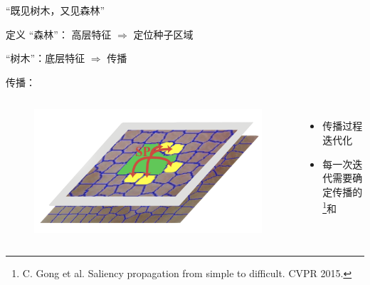 \begin{frame}{``既见树木，又见森林''}
\begin{block}{定义}
``森林''： 高层特征 $\Rightarrow$ 定位种子区域

``树木''：底层特征 $\Rightarrow$ 传播
\end{block}
\vfill
传播：
\begin{columns}[c]
\begin{figure}
    \centering
    \includegraphics[width=.9\linewidth]{figures/propagationillustrator.png}
\end{figure}

\begin{itemize}
\item 传播过程迭代化
\item 每一次迭代需要确定传播的{\color{blue}{顺序}}\footnote[frame]{\tiny C. Gong et al. Saliency propagation from simple to difficult. CVPR 2015.}和{\color{blue}{数量}}
\end{itemize}
\end{columns}

\end{frame}
